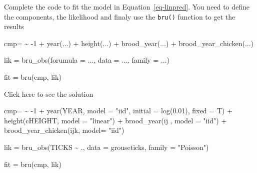 \documentclass[
  letterpaper,
  DIV=11,
  numbers=noendperiod]{scrartcl}
\newenvironment{Shaded}{\begin{snugshade}}{\end{snugshade}}
\newcommand{\AttributeTok}[1]{\textcolor[rgb]{0.40,0.45,0.13}{#1}}
\newcommand{\DecValTok}[1]{\textcolor[rgb]{0.68,0.00,0.00}{#1}}
\newcommand{\ErrorTok}[1]{\textcolor[rgb]{0.68,0.00,0.00}{#1}}
\newcommand{\FloatTok}[1]{\textcolor[rgb]{0.68,0.00,0.00}{#1}}
\newcommand{\FunctionTok}[1]{\textcolor[rgb]{0.28,0.35,0.67}{#1}}
\newcommand{\NormalTok}[1]{\textcolor[rgb]{0.00,0.23,0.31}{#1}}
\newcommand{\OtherTok}[1]{\textcolor[rgb]{0.00,0.23,0.31}{#1}}
\newcommand{\SpecialCharTok}[1]{\textcolor[rgb]{0.37,0.37,0.37}{#1}}
\newcommand{\StringTok}[1]{\textcolor[rgb]{0.13,0.47,0.30}{#1}}
\begin{document}
\begin{tcolorbox}[enhanced jigsaw, rightrule=.15mm, colframe=quarto-callout-warning-color-frame, colback=white, coltitle=black, opacitybacktitle=0.6, opacityback=0, breakable, arc=.35mm, bottomrule=.15mm, toptitle=1mm, toprule=.15mm, colbacktitle=quarto-callout-warning-color!10!white, bottomtitle=1mm, title={Task}, titlerule=0mm, leftrule=.75mm, left=2mm]

Complete the code to fit the model in Equation~\ref{eq-linpred}. You
need to define the components, the likelihood and finaly use the
\texttt{bru()} function to get the results

\begin{Shaded}
\begin{Highlighting}[]
\NormalTok{cmp}\OtherTok{=} \ErrorTok{\textasciitilde{}} \SpecialCharTok{{-}}\DecValTok{1} \SpecialCharTok{+} \FunctionTok{year}\NormalTok{(...) }\SpecialCharTok{+}
  \FunctionTok{height}\NormalTok{(...) }\SpecialCharTok{+} 
  \FunctionTok{brood\_year}\NormalTok{(...) }\SpecialCharTok{+}
  \FunctionTok{brood\_year\_chicken}\NormalTok{(...)}

\NormalTok{lik }\OtherTok{=} \FunctionTok{bru\_obs}\NormalTok{(}\AttributeTok{forumula =}\NormalTok{ ...,}
              \AttributeTok{data =}\NormalTok{ ...,}
              \AttributeTok{family =}\NormalTok{ ...)}

\NormalTok{fit }\OtherTok{=} \FunctionTok{bru}\NormalTok{(cmp, lik)}
\end{Highlighting}
\end{Shaded}

Click here to see the solution

\begin{Shaded}
\begin{Highlighting}[]
\NormalTok{cmp}\OtherTok{=} \ErrorTok{\textasciitilde{}} \SpecialCharTok{{-}}\DecValTok{1} \SpecialCharTok{+} \FunctionTok{year}\NormalTok{(YEAR, }\AttributeTok{model =} \StringTok{"iid"}\NormalTok{, }\AttributeTok{initial =} \FunctionTok{log}\NormalTok{(}\FloatTok{0.01}\NormalTok{), }\AttributeTok{fixed =}\NormalTok{ T) }\SpecialCharTok{+}
  \FunctionTok{height}\NormalTok{(cHEIGHT, }\AttributeTok{model =}  \StringTok{"linear"}\NormalTok{) }\SpecialCharTok{+} 
  \FunctionTok{brood\_year}\NormalTok{(ij , }\AttributeTok{model =} \StringTok{"iid"}\NormalTok{) }\SpecialCharTok{+}
  \FunctionTok{brood\_year\_chicken}\NormalTok{(ijk, }\AttributeTok{model=} \StringTok{"iid"}\NormalTok{)}

\NormalTok{lik }\OtherTok{=} \FunctionTok{bru\_obs}\NormalTok{(TICKS }\SpecialCharTok{\textasciitilde{}}\NormalTok{ .,}
              \AttributeTok{data =}\NormalTok{ grouseticks,}
              \AttributeTok{family =} \StringTok{"Poisson"}\NormalTok{)}

  
\NormalTok{fit }\OtherTok{=} \FunctionTok{bru}\NormalTok{(cmp, lik)}
\end{Highlighting}
\end{Shaded}

\end{tcolorbox}
\end{document}
